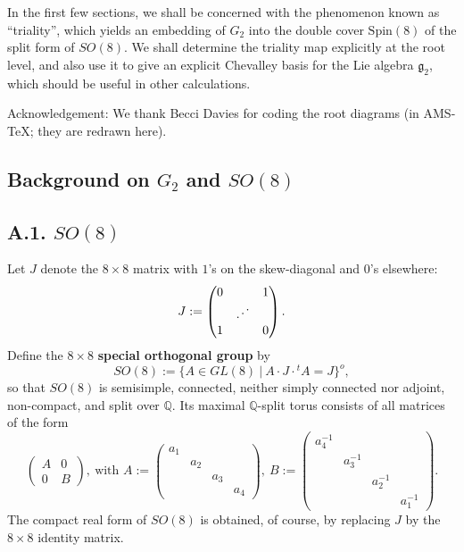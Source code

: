 \documentclass[12pt,letterpaper]{amsart}
\theoremstyle{plain}
\theoremstyle{definition}
\theoremstyle{remark}
\theoremstyle{definition}
\newcommand{\qqq}{\mathbb{Q}}
\newcommand{\iddots}{\mathinner{\mkern1mu\raise1pt\hbox{.}\mkern2mu%
  \raise4pt\hbox{.}\mkern2mu\raise7pt\vbox{\kern7pt\hbox{.}}\mkern1mu}}
\begin{document}
In the first few sections, we shall be concerned with the phenomenon
known as ``triality'',
which yields an embedding of $G_2$ into the double cover $\mathrm{Spin}(8)$ of
the split form of $SO(8)$. We shall
determine the triality map explicitly at the root level, and also use it to
give an explicit Chevalley basis for the Lie algebra ${\mathfrak g}_2$,
which should be useful in other calculations.

\noindent
Acknowledgement: We thank Becci Davies for coding the root diagrams
(in AMS-\TeX; they are redrawn here).

\subsection*{Background on \texorpdfstring{$G_2$ and $SO(8)$}{G2 and SO(8)}}

\subsection*{A.1. \texorpdfstring{$SO(8)$}{SO(8)}}

Let $J$ denote the $8\times 8$ matrix with $1$'s on the skew-diagonal and
$0$'s elsewhere:
\[
J := \begin{pmatrix} 0 & & 1 \\
   & \iddots & \\
   1 & & 0
   \end{pmatrix}.
\]
Define the $8\times 8$ \textbf{special orthogonal group}
by
\[
SO(8) := \{A \in GL(8) \ |\ A\cdot J\cdot {}^{t}A = J\}^o,
\]
so that $SO(8)$ is semisimple, connected, neither simply connected
nor adjoint, non-compact, and split over $\qqq$. Its maximal $\qqq$-split
torus consists of all matrices of the form
\[
\begin{pmatrix} A&0\\0&B \end{pmatrix},\ \text{with }
A:=\begin{pmatrix} a_1&&&\\
&a_2&&\\
&&a_3&\\
&&&a_4 \end{pmatrix},\
B:= \begin{pmatrix} a_4^{-1}&&&\\
&a_3^{-1}&&\\
&&a_2^{-1}&\\
&&&a_1^{-1} \end{pmatrix}.\tag{A.1}
\]
The compact real form of $SO(8)$ is obtained, of course, by replacing
$J$ by the $8\times 8$ identity matrix.
\end{document}
